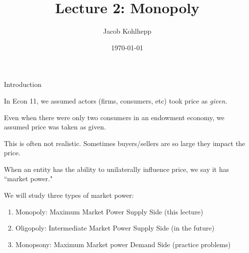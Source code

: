 \documentclass[aspectratio=169]{beamer}
\title[Risk]{Lecture 2: Monopoly} %
\author{Jacob Kohlhepp} %
\institute[UCLA] %
{
Econ 101 \\ %
\medskip
}
\date{\today} %
\newenvironment{wideitemize}{\itemize\addtolength{\itemsep}{10pt}}{\enditemize}
\begin{document}
\begin{frame}
\titlepage %
\end{frame}

\begin{frame}{Introduction}
\begin{wideitemize}
    \item In Econ 11, we assumed actors (firms, consumers, etc) took price as \textit{given.}
    \item Even when there were only two consumers in an endowment economy, we assumed price was taken as given.
    \item This is often not realistic. Sometimes buyers/sellers are so large they impact the price.
    \item When an entity has the ability to unilaterally influence price, we say it has ``market power."
    \item We will study three types of market power:
    \begin{enumerate}
        \item Monopoly: Maximum Market Power Supply Side (this lecture)
        \item Oligopoly: Intermediate Market Power Supply Side (in the future)
        \item Monopsony: Maximum Market power Demand Side (practice problems)
    \end{enumerate}
\end{wideitemize}

\end{frame}
\end{document}
